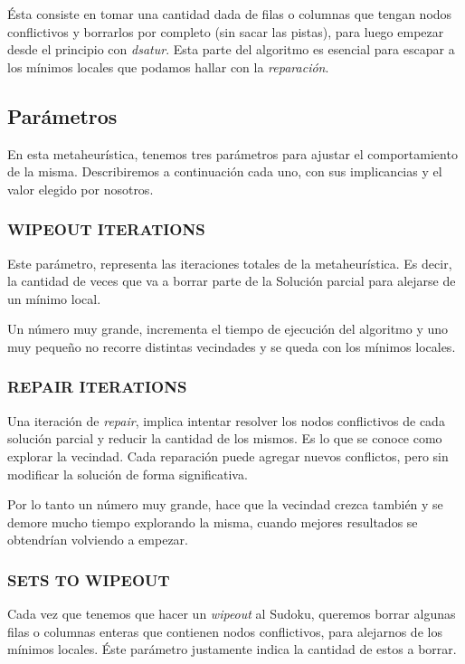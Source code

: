\documentclass[a4paper,spanish]{article}
\begin{document}
Ésta consiste en tomar una cantidad dada de filas o columnas que tengan nodos
conflictivos y borrarlos por completo (sin sacar las pistas), para luego empezar
desde el principio con \emph{dsatur}. Esta parte del algoritmo es esencial para escapar
a los mínimos locales que podamos hallar con la \textit{reparación}.


\subsection{Parámetros}

En esta metaheurística, tenemos tres parámetros para ajustar el comportamiento de la misma.
Describiremos a continuación cada uno, con sus implicancias y el valor elegido por nosotros.


\subsubsection{WIPEOUT ITERATIONS}

Este parámetro, representa las iteraciones totales de la metaheurística.
Es decir, la cantidad de veces que va a borrar parte de la Solución parcial
para alejarse de un mínimo local.

Un número muy grande, incrementa el tiempo de ejecución del algoritmo y uno muy pequeño
no recorre distintas vecindades y se queda con los mínimos locales.


\subsubsection{REPAIR ITERATIONS}

Una iteración de \emph{repair}, implica intentar resolver los nodos conflictivos de
cada solución parcial y reducir la cantidad de los mismos. Es lo que se conoce como
explorar la vecindad. Cada reparación puede agregar nuevos conflictos, pero sin modificar
la solución de forma significativa.

Por lo tanto un número muy grande, hace que la vecindad crezca también y se demore mucho
tiempo explorando la misma, cuando mejores resultados se obtendrían volviendo a empezar.


\subsubsection{SETS TO WIPEOUT}

Cada vez que tenemos que hacer un \emph{wipeout} al Sudoku, queremos borrar algunas filas o
columnas enteras que contienen nodos conflictivos, para alejarnos de los mínimos locales.
Éste parámetro justamente indica la cantidad de estos a borrar.
\end{document}
